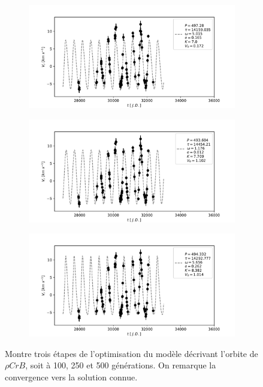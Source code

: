 \documentclass{article}
\begin{document}
\begin{figure}[H]
	\centering
	\begin{subfigure}{.9\linewidth}
		\centering
		\includegraphics[scale=0.7]{imgs/nbootis/100.pdf}
		\caption{}
	\end{subfigure}
	\begin{subfigure}{.9\linewidth}
		\centering
		\includegraphics[scale=0.7]{imgs/nbootis/250.pdf}
		\caption{}
	\end{subfigure}
	\begin{subfigure}{.9\linewidth}
		\centering
		\includegraphics[scale=0.7]{imgs/nbootis/500.pdf}
		\caption{}
	\end{subfigure}
	\caption{Montre trois étapes de l'optimisation du modèle décrivant l'orbite de $\rho CrB$, soit à 100, 250 et 500 générations. On remarque la convergence vers la solution connue.} 
	\label{fig:convergence_orbite}
\end{figure}
\end{document}
